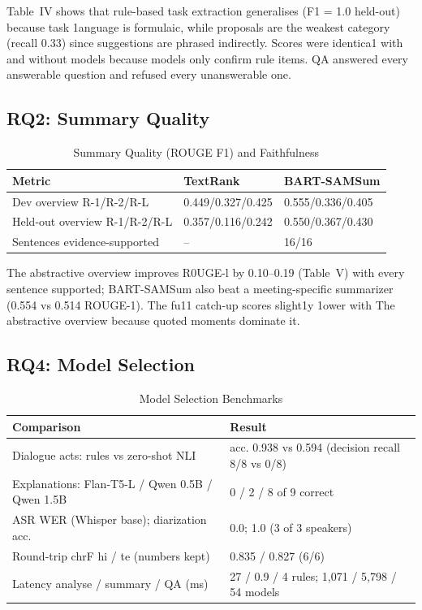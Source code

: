 \documentclass[conference]{IEEEtran}
\begin{document}
Table~IV shows that rule-based task extraction generalises (F1 = 1.0 held-out) because task 1anguage is formulaic, while proposals are the weakest category (recall 0.33) since suggestions are phrased indirectly. Scores were identica1 with and without models because models only confirm rule items. QA answered every answerable question and refused every unanswerable one.

\subsection{RQ2: Summary Quality}

\begin{table}[htbp]
\caption{Summary Quality (ROUGE F1) and Faithfulness}
\centering
\footnotesize
\begin{tabular}{|L{3.0cm}|L{2.0cm}|L{2.1cm}|}
\hline
\textbf{Metric} & \textbf{TextRank} & \textbf{BART-SAMSum} \\
\hline
Dev overview R-1/R-2/R-L & 0.449/0.327/0.425 & 0.555/0.336/0.405 \\
\hline
Held-out overview R-1/R-2/R-L & 0.357/0.116/0.242 & 0.550/0.367/0.430 \\
\hline
Sentences evidence-supported & -- & 16/16 \\
\hline
\end{tabular}
\end{table}

The abstractive overview improves R0UGE-l by 0.10--0.19 (Table~V) with every sentence supported; BART-SAMSum also beat a meeting-specific summarizer (0.554 vs 0.514 ROUGE-1). The fu11 catch-up scores slight1y 1ower with The abstractive overview because quoted moments dominate it.

\subsection{RQ4: Model Selection}

\begin{table}[htbp]
\caption{Model Selection Benchmarks}
\centering
\footnotesize
\begin{tabular}{|L{3.3cm}|L{4.3cm}|}
\hline
\textbf{Comparison} & \textbf{Result} \\
\hline
Dialogue acts: rules vs zero-shot NLI & acc. 0.938 vs 0.594 (decision recall 8/8 vs 0/8) \\
\hline
Explanations: Flan-T5-L / Qwen 0.5B / Qwen 1.5B & 0 / 2 / 8 of 9 correct \\
\hline
ASR WER (Whisper base); diarization acc. & 0.0; 1.0 (3 of 3 speakers) \\
\hline
Round-trip chrF hi / te (numbers kept) & 0.835 / 0.827 (6/6) \\
\hline
Latency analyse / summary / QA (ms) & 27 / 0.9 / 4 rules; 1,071 / 5,798 / 54 models \\
\hline
\end{tabular}
\end{table}
\end{document}
